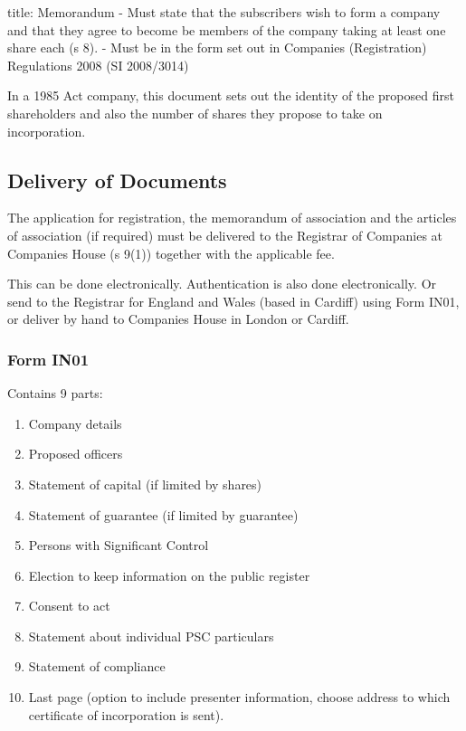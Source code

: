 \documentclass[
]{article}
\newenvironment{Shaded}{}{}
\newcommand{\NormalTok}[1]{#1}
\providecommand{\tightlist}{%
  \setlength{\itemsep}{0pt}\setlength{\parskip}{0pt}}
\begin{document}
\begin{Shaded}
\begin{Highlighting}[]
\NormalTok{title: Memorandum}
\NormalTok{{-} Must state that the subscribers wish to form a company and that they agree to become be members of the company taking at least one share each (s 8).}
\NormalTok{{-} Must be in the form set out in Companies (Registration) Regulations 2008 (SI 2008/3014)}
\end{Highlighting}
\end{Shaded}

In a 1985 Act company, this document sets out the identity of the
proposed first shareholders and also the number of shares they propose
to take on incorporation.

\hypertarget{delivery-of-documents}{%
\subsection{Delivery of Documents}\label{delivery-of-documents}}

The application for registration, the memorandum of association and the
articles of association (if required) must be delivered to the Registrar
of Companies at Companies House (s 9(1)) together with the applicable
fee.

This can be done electronically. Authentication is also done
electronically. Or send to the Registrar for England and Wales (based in
Cardiff) using Form IN01, or deliver by hand to Companies House in
London or Cardiff.

\hypertarget{form-in01}{%
\subsubsection{Form IN01}\label{form-in01}}

Contains 9 parts:

\begin{enumerate}
\def\labelenumi{\arabic{enumi}.}
\tightlist
\item
  Company details
\item
  Proposed officers
\item
  Statement of capital (if limited by shares)
\item
  Statement of guarantee (if limited by guarantee)
\item
  Persons with Significant Control
\item
  Election to keep information on the public register
\item
  Consent to act
\item
  Statement about individual PSC particulars
\item
  Statement of compliance
\item
  Last page (option to include presenter information, choose address to
  which certificate of incorporation is sent).
\end{enumerate}
\end{document}
